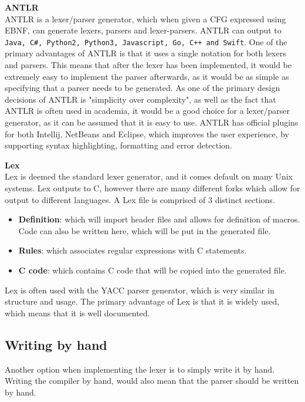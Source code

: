 \textbf{ANTLR}\\
ANTLR is a lexer/parser generator, which when given a CFG expressed using EBNF, can generate lexers, parsers and lexer-parsers\cite{ANTLR}.
ANTLR can output to \texttt{Java, C\#, Python2, Python3, Javascript, Go, C++ and Swift}\cite{ANTLRDocsTargets}.
One of the primary advantages of ANTLR is that it uses a single notation for both lexers and parsers\cite{ANTLRDocs}.
This means that after the lexer has been implemented, it would be extremely easy to implement the parser afterwards, as it would be as simple as specifying that a parser needs to be generated.
As one of the primary design decisions of ANTLR is "simplicity over complexity", as well as the fact that ANTLR is often used in academia, it would be a good choice for a lexer/parser generator, as it can be assumed that it is easy to use.
ANTLR has official plugins for both Intellij, NetBeans and Eclipse, which improves the user experience, by supporting syntax highlighting, formatting and error detection.

\textbf{Lex}\\
Lex is deemed the standard lexer generator, and it comes default on many Unix systems.
Lex outputs to C, however there are many different forks which allow for output to different languages.
A Lex file is comprised of 3 distinct sections\cite{Lex}.
\begin{itemize}
	\item \textbf{Definition}: which will import header files and allows for definition of macros. 
	Code can also be written here, which will be put in the generated file.
	\item \textbf{Rules}: which associates regular expressions with C statements.
	\item \textbf{C code}: which contains C code that will be copied into the generated file.
\end{itemize}
Lex is often used with the YACC parser generator, which is very similar in structure and usage.
The primary advantage of Lex is that it is widely used, which means that it is well documented.

\subsection{Writing by hand}
Another option when implementing the lexer is to simply write it by hand.
Writing the compiler by hand, would also mean that the parser should be written by hand.

